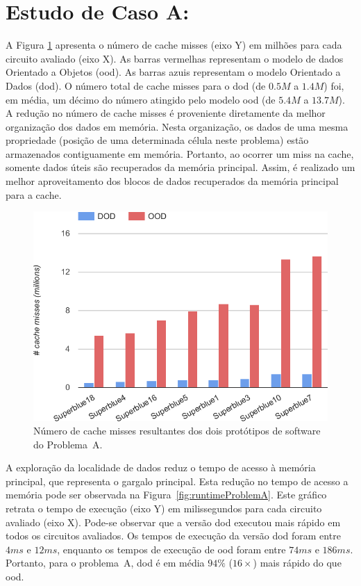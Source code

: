 \section{Estudo de Caso A:}
\label{sec:problema_a}

A Figura \ref{fig:missProblemA} apresenta o número de cache misses (eixo Y) em milhões para cada circuito avaliado (eixo X). As barras vermelhas representam o modelo de dados Orientado a Objetos (\ac{ood}). As barras azuis representam o modelo Orientado a Dados (\ac{dod}). O número total de cache misses para o \ac{dod} (de $0.5M$ a $1.4M$) foi, em média, um décimo do número atingido pelo modelo \ac{ood} (de $5.4M$ a $13.7M$). A redução no número de cache misses é proveniente diretamente da melhor organização dos dados em memória. Nesta organização, os dados de uma mesma propriedade (posição de uma determinada célula neste problema) estão armazenados contiguamente em memória. Portanto, ao ocorrer um miss na cache, somente dados úteis são recuperados da memória principal. Assim, é realizado um melhor aproveitamento dos blocos de dados recuperados da memória principal para a cache. 

\begin{figure}[ht]
    \centering
    \includegraphics[width=0.7\linewidth]{img/results/missProblemA}
    \caption[Cache misses do Problema~A.]{Número de cache misses resultantes dos dois protótipos de software do Problema~A.}
    \label{fig:missProblemA}
\end{figure}

A exploração da localidade de dados reduz o tempo de acesso à memória principal, que representa o gargalo principal. Esta redução no tempo de acesso a memória pode ser observada na Figura~\ref{fig:runtimeProblemA}. Este gráfico retrata o tempo de execução (eixo Y) em milissegundos para cada circuito avaliado (eixo X). Pode-se observar que a versão \ac{dod} executou mais rápido em todos os circuitos avaliados. Os tempos de execução da versão \ac{dod} foram entre $4ms$ e $12ms$, enquanto os tempos de execução de \ac{ood} foram entre $74ms$ e $186ms$. Portanto, para o problema~A, \ac{dod} é em média $94\%$ ($16\times$) mais rápido do que \ac{ood}.

